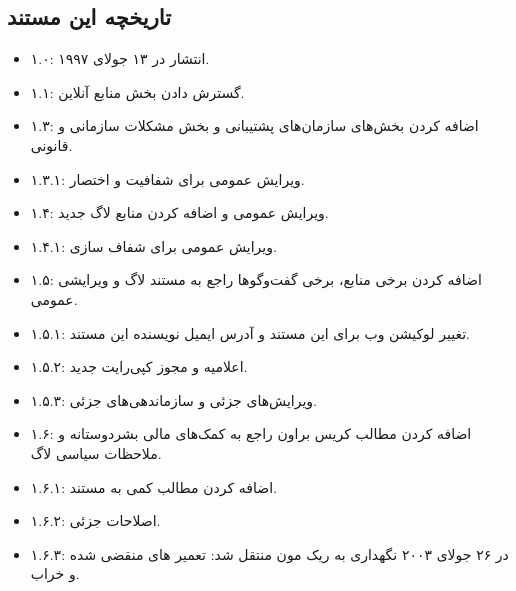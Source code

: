 \subsection{تاریخچه این مستند}

\begin{itemize}
\item
۱.۰: انتشار در ۱۳ جولای ۱۹۹۷.
\item
۱.۱: گسترش دادن بخش منابع آنلاین.
\item
۱.۳: اضافه کردن بخش‌های سازمان‌های پشتیبانی و بخش مشکلات سازمانی و قانونی.
\item
۱.۳.۱: ویرایش عمومی برای شفافیت و اختصار.
\item
۱.۴: ویرایش عمومی و اضافه کردن منابع لاگ جدید.
\item
۱.۴.۱: ویرایش عمومی برای شفاف سازی.
\item
۱.۵: اضافه کردن برخی منابع، برخی گفت‌وگوها راجع به مستند لاگ و ویرایشی عمومی.
\item
۱.۵.۱: تغییر لوکیشن وب برای این مستند و آدرس ایمیل نویسنده این مستند.
\item
۱.۵.۲: اعلامیه و مجوز کپی‌رایت جدید.
\item
۱.۵.۳: ویرایش‌های جزئی و سازماندهی‌‌های جزئی.
\item
۱.۶: اضافه کردن مطالب کریس براون راجع به کمک‌های مالی بشردوستانه و ملاحظات سیاسی لاگ.
\item
۱.۶.۱: اضافه کردن مطالب کمی به مستند.
\item
۱.۶.۲: اصلاحات جزئی.
\item
۱.۶.۳: در ۲۶ جولای ۲۰۰۳ نگهداری به ریک مون منتقل شد: تعمیر  های منقضی شده و خراب.

\end{itemize}
